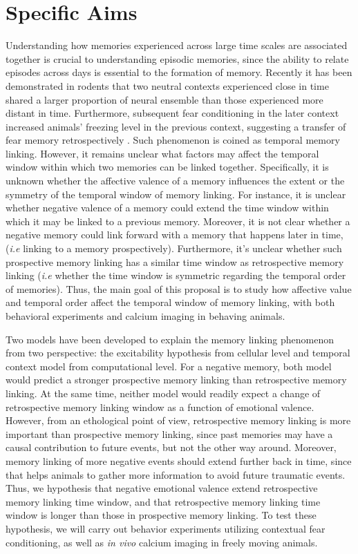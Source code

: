 \documentclass[master.tex]{subfiles}
\begin{document}
\section*{Specific Aims}

Understanding how memories experienced across large time scales are associated
together is crucial to understanding episodic memories, since the ability to
relate episodes across days is essential to the formation of memory. Recently it
has been demonstrated in rodents that two neutral contexts experienced close in
time shared a larger proportion of neural ensemble than those experienced more
distant in time. Furthermore, subsequent fear conditioning in the later context
increased animals' freezing level in the previous context, suggesting a transfer
of fear memory retrospectively \cite{cai_shared_2016}. Such phenomenon is coined
as temporal memory linking. However, it remains unclear what factors may affect
the temporal window within which two memories can be linked together.
Specifically, it is unknown whether the affective valence of a memory influences
the extent or the symmetry of the temporal window of memory linking. For
instance, it is unclear whether negative valence of a memory could extend the
time window within which it may be linked to a previous memory. Moreover, it is
not clear whether a negative memory could link forward with a memory that
happens later in time, (\textit{i.e} linking to a memory prospectively).
Furthermore, it's unclear whether such prospective memory linking has a similar
time window as retrospective memory linking (\textit{i.e} whether the time
window is symmetric regarding the temporal order of memories). Thus, the main
goal of this proposal is to study how affective value and temporal order affect
the temporal window of memory linking, with both behavioral experiments and
calcium imaging in behaving animals.

Two models have been developed to explain the memory linking phenomenon from two
perspective: the excitability hypothesis from cellular level and temporal
context model from computational level. For a negative memory, both model would
predict a stronger prospective memory linking than retrospective memory linking.
At the same time, neither model would readily expect a change of retrospective
memory linking window as a function of emotional valence. However, from an
ethological point of view, retrospective memory linking is more important than
prospective memory linking, since past memories may have a causal contribution
to future events, but not the other way around. Moreover, memory linking of more
negative events should extend further back in time, since that helps animals to
gather more information to avoid future traumatic events. Thus, we hypothesis
that negative emotional valence extend retrospective memory linking time window,
and that retrospective memory linking time window is longer than those in
prospective memory linking. To test these hypothesis, we will carry out behavior
experiments utilizing contextual fear conditioning, as well as \textit{in vivo}
calcium imaging in freely moving animals.
\end{document}
